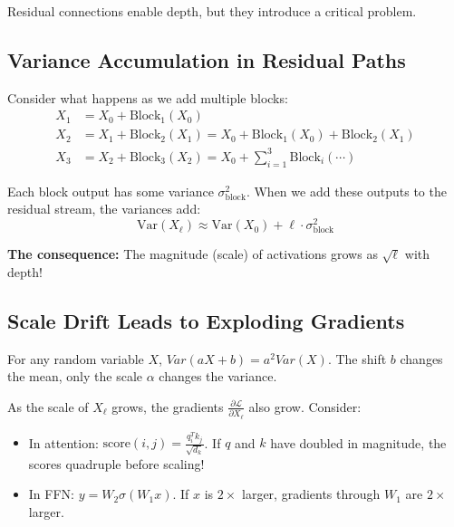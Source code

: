 \documentclass{article}
\begin{document}
Residual connections enable depth, but they introduce a critical problem.

\subsection{Variance Accumulation in Residual Paths}

Consider what happens as we add multiple blocks:
\begin{align}
X_1 &= X_0 + \text{Block}_1(X_0) \\
X_2 &= X_1 + \text{Block}_2(X_1) = X_0 + \text{Block}_1(X_0) + \text{Block}_2(X_1) \\
X_3 &= X_2 + \text{Block}_3(X_2) = X_0 + \sum_{i=1}^3 \text{Block}_i(\cdots)
\end{align}

Each block output has some variance $\sigma^2_{\text{block}}$. When we add these outputs to the residual stream, the variances add:
\[
\text{Var}(X_\ell) \approx \text{Var}(X_0) + \ell \cdot \sigma^2_{\text{block}}
\]

\textbf{The consequence:} The magnitude (scale) of activations grows as $\sqrt{\ell}$ with depth!

\begin{center}
\end{center}

\subsection{Scale Drift Leads to Exploding Gradients}

For any random variable $X$,  $Var(aX+b)=a^2 Var(X)$. The shift $b$ changes the mean, only the scale $\alpha$ changes the variance.

As the scale of $X_\ell$ grows, the gradients $\frac{\partial \mathcal{L}}{\partial X_\ell}$ also grow. Consider:
\begin{itemize}
\item In attention: $\text{score}(i,j) = \frac{q_i^T k_j}{\sqrt{d_k}}$. If $q$ and $k$ have doubled in magnitude, the scores quadruple before scaling!
\item In FFN: $y = W_2 \sigma(W_1 x)$. If $x$ is $2\times$ larger, gradients through $W_1$ are $2\times$ larger.
\end{itemize}
\end{document}

